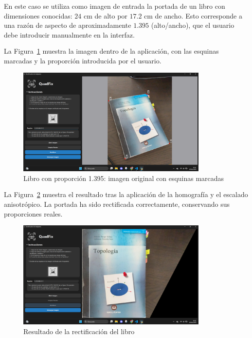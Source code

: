 En este caso se utiliza como imagen de entrada la portada de un libro con dimensiones conocidas: $24$ cm de alto por $17.2$ cm de ancho. Esto corresponde a una razón de aspecto de aproximadamente $1.395$ (alto/ancho), que el usuario debe introducir manualmente en la interfaz.

La Figura~\ref{fg:libro-original} muestra la imagen dentro de la aplicación, con las esquinas marcadas y la proporción introducida por el usuario.

\begin{figure}[H]
    \centering
    \includegraphics[width=0.85\textwidth]{figures/4.Examples/Especial/Libro1.png}
    \caption{Libro con proporción 1.395: imagen original con esquinas marcadas}
    \label{fg:libro-original}
\end{figure}

La Figura~\ref{fg:libro-rectificado} muestra el resultado tras la aplicación de la homografía y el escalado anisotrópico. La portada ha sido rectificada correctamente, conservando sus proporciones reales.

\begin{figure}[H]
    \centering
    \includegraphics[width=0.85\textwidth]{figures/4.Examples/Especial/Libro2.png}
    \caption{Resultado de la rectificación del libro}
    \label{fg:libro-rectificado}
\end{figure}

